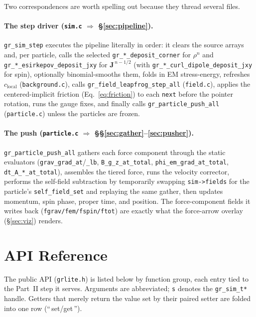 \documentclass[11pt]{article}
\newcommand{\vv}[1]{\mathbf{#1}}           %
\newcommand{\clocal}{c_{\mathrm{local}}}
\begin{document}
Two correspondences are worth spelling out because they thread several files.

\paragraph{The step driver (\texttt{sim.c} $\Rightarrow$ \S\ref{sec:pipeline}).}
\texttt{gr\_sim\_step} executes the pipeline literally in order: it clears the
source arrays and, per particle, calls the selected
\texttt{gr\_*\_deposit\_corner} for $\rho^n$ and \texttt{gr\_*\_esirkepov\_deposit\_jxy}
for $\vv J^{\,n-1/2}$ (with \texttt{gr\_*\_curl\_dipole\_deposit\_jxy} for spin),
optionally binomial-smooths them, folds in EM stress-energy, refreshes $\clocal$
(\texttt{background.c}), calls \texttt{gr\_field\_leapfrog\_step\_all}
(\texttt{field.c}), applies the centered-implicit friction
(Eq.~\eqref{eq:friction}) to each \texttt{next} before the pointer rotation, runs
the gauge fixes, and finally calls \texttt{gr\_particle\_push\_all}
(\texttt{particle.c}) unless the particles are frozen.

\paragraph{The push (\texttt{particle.c} $\Rightarrow$ \S\S\ref{sec:gather}--\ref{sec:pusher}).}
\texttt{gr\_particle\_push\_all} gathers each force component through the static
evaluators (\texttt{grav\_grad\_at}/\texttt{\_lb}, \texttt{B\_g\_z\_at\_total},
\texttt{phi\_em\_grad\_at\_total}, \texttt{dt\_A\_*\_at\_total}), assembles the
tiered force, runs the velocity corrector, performs the self-field subtraction by
temporarily swapping \texttt{sim->fields} for the particle's
\texttt{self\_field\_set} and replaying the same gather, then updates momentum,
spin phase, proper time, and position. The force-component fields it writes back
(\texttt{fgrav/fem/fspin/ftot}) are exactly what the force-arrow overlay
(\S\ref{sec:viz}) renders.

\section{API Reference}
\label{sec:api}

The public API (\texttt{grlite.h}) is listed below by function group, each entry
tied to the Part~II step it serves. Arguments are abbreviated; \texttt{s}
denotes the \texttt{gr\_sim\_t*} handle. Getters that merely return the value set
by their paired setter are folded into one row (``\,set/get\,'').
\end{document}
